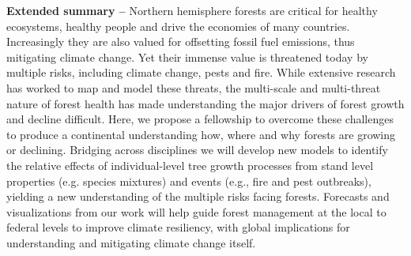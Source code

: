 \documentclass[11pt]{article}
\begin{document}
{\bf Extended summary --} Northern hemisphere forests are critical for healthy ecosystems, healthy people and drive the economies of many countries. Increasingly they are also valued for offsetting fossil fuel emissions, thus mitigating climate change. Yet their immense value is threatened today by multiple risks, including climate change, pests and fire. While extensive research has worked to map and model these threats, the multi-scale and multi-threat nature of forest health has made understanding the major drivers of forest growth and decline difficult. Here, we propose a fellowship to overcome these challenges to produce a continental understanding how, where and why forests are growing or declining. Bridging across disciplines we will develop new models to identify the relative effects of individual-level tree growth processes from stand level properties (e.g. species mixtures) and events (e.g., fire and pest outbreaks), yielding a new understanding of the multiple risks facing forests. Forecasts and visualizations from our work will help guide forest management at the local to federal levels to improve climate resiliency, with global implications for understanding and mitigating climate change itself. 
\end{document}
